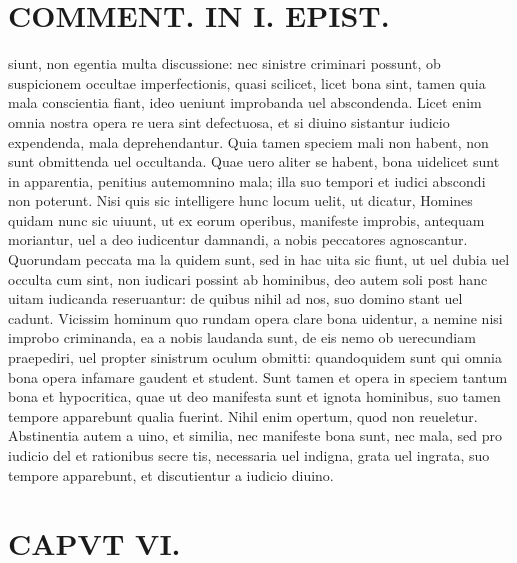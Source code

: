 \documentclass{article}
\begin{document}
\begin{pages}
\section*{COMMENT. IN I. EPIST. }
\marginpar{[ p.528 ]}\pstart siunt, non egentia multa discussione: nec sinistre criminari possunt, ob suspicionem occultae imperfectionis, quasi scilicet, licet bona sint, tamen quia mala conscientia fiant, ideo ueniunt improbanda uel abscondenda. Licet enim omnia nostra opera re uera sint defectuosa, et si diuino sistantur iudicio expendenda, mala deprehendantur. Quia tamen speciem mali non habent, non sunt obmittenda uel occultanda. Quae uero aliter se habent, bona uidelicet sunt in apparentia, penitius autemomnino mala; illa suo tempori et iudici abscondi non poterunt. Nisi quis sic intelligere hunc locum uelit, ut dicatur, Homines quidam nunc sic uiuunt, ut ex eorum operibus, manifeste improbis, antequam moriantur, uel a deo iudicentur damnandi, a nobis peccatores agnoscantur. Quorundam peccata ma la quidem sunt, sed in hac uita sic fiunt, ut uel dubia uel occulta cum sint, non iudicari possint ab hominibus, deo autem soli post hanc uitam iudicanda reseruantur: de quibus nihil ad nos, suo domino stant uel cadunt. Vicissim hominum quo rundam opera clare bona uidentur, a nemine nisi improbo criminanda, ea a nobis laudanda sunt, de eis nemo ob uerecundiam praepediri, uel propter sinistrum oculum obmitti: quandoquidem sunt qui omnia bona opera infamare gaudent et student. Sunt tamen et opera in speciem tantum bona et hypocritica, quae ut deo manifesta sunt et ignota hominibus, suo tamen tempore apparebunt qualia fuerint. Nihil enim opertum, quod non reueletur. Abstinentia autem a uino, et similia, nec manifeste bona sunt, nec mala, sed pro iudicio del et rationibus secre tis, necessaria uel indigna, grata uel ingrata, suo tempore apparebunt, et discutientur a iudicio diuino.  \pend
\endnumbering\beginnumbering\section{CAPVT VI.}
{}

\end{pages}
\end{document}
